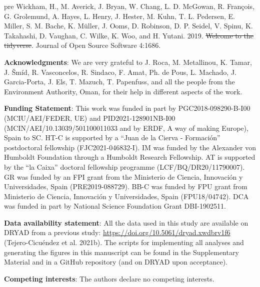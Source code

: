 \documentclass[
  11pt,
]{article}
\newlength{\cslhangindent} %
\newlength{\cslentryspacingunit} %
\newenvironment{CSLReferences}[2] %
 {%
  \setlength{\parindent}{0pt} %
  \ifodd #1 %
  \let\oldpar\par %
  \def\par{\hangindent=\cslhangindent\oldpar} %
  \fi %
  \setlength{\parskip}{#2\cslentryspacingunit} %
 }%
 {} %
\providecommand{\DIFaddtex}[1]{{\protect\color{blue}\uwave{#1}}} %
\providecommand{\DIFdeltex}[1]{{\protect\color{red}\sout{#1}}}                      %
\providecommand{\DIFaddbegin}{} %
\providecommand{\DIFaddend}{} %
\providecommand{\DIFdelbegin}{} %
\providecommand{\DIFdelend}{} %
\providecommand{\DIFadd}[1]{\texorpdfstring{\DIFaddtex{#1}}{#1}} %
\providecommand{\DIFdel}[1]{\texorpdfstring{\DIFdeltex{#1}}{}} %
\newcommand{\DIFscaledelfig}{0.5}
\newlength{\DIFdelgraphicswidth} %
\newlength{\DIFdelgraphicsheight} %
\newcommand{\DIFaddincludegraphics}[2][]{{\color{blue}\fbox{\DIFOincludegraphics[#1]{#2}}}} %
\newcommand{\DIFdelincludegraphics}[2][]{%
\sbox{\DIFdelgraphicsbox}{\DIFOincludegraphics[#1]{#2}}%
\settoboxwidth{\DIFdelgraphicswidth}{\DIFdelgraphicsbox} %
\settoboxtotalheight{\DIFdelgraphicsheight}{\DIFdelgraphicsbox} %
\scalebox{\DIFscaledelfig}{%
\parbox[b]{\DIFdelgraphicswidth}{\usebox{\DIFdelgraphicsbox}\\[-\baselineskip] \rule{\DIFdelgraphicswidth}{0em}}\llap{\resizebox{\DIFdelgraphicswidth}{\DIFdelgraphicsheight}{%
\setlength{\unitlength}{\DIFdelgraphicswidth}%
\begin{picture}(1,1)%
\thicklines\linethickness{2pt} %
{\color[rgb]{1,0,0}\put(0,0){\framebox(1,1){}}}%
{\color[rgb]{1,0,0}\put(0,0){\line( 1,1){1}}}%
{\color[rgb]{1,0,0}\put(0,1){\line(1,-1){1}}}%
\end{picture}%
}\hspace*{3pt}}} %
} %
\DeclareRobustCommand{\DIFaddbegin}{\DIFOaddbegin \let\includegraphics\DIFaddincludegraphics} %
\DeclareRobustCommand{\DIFaddend}{\DIFOaddend \let\includegraphics\DIFOincludegraphics} %
\DeclareRobustCommand{\DIFdelbegin}{\DIFOdelbegin \let\includegraphics\DIFdelincludegraphics} %
\DeclareRobustCommand{\DIFdelend}{\DIFOaddend \let\includegraphics\DIFOincludegraphics} %
\begin{document}
\begin{CSLReferences}{1}{0}
\leavevmode\DIFaddbegin \vadjust \DIFadd{pre}{\DIFaddend \hypertarget{ref-Wickham2019}{}\DIFaddbegin }\DIFaddend %
Wickham, H., M. Averick, J. Bryan, W. Chang, L. D. McGowan, R. François,
G. Grolemund, A. Hayes, L. Henry, J. Hester, M. Kuhn, T. L. Pedersen, E.
Miller, S. M. Bache, K. Müller, J. Ooms, D. Robinson, D. P. Seidel, V.
Spinu, K. Takahashi, D. Vaughan, C. Wilke, K. Woo, and H. Yutani. 2019.
\DIFdelbegin \DIFdel{Welcome to the tidyverse}\DIFdelend \DIFaddbegin \href{https://doi.org/10.21105/joss.01686}{\DIFadd{Welcome to the }{\DIFadd{tidyverse}}}\DIFaddend .
Journal of Open Source Software 4:1686.

\DIFaddbegin \end{CSLReferences}

\DIFaddend \newpage

\hfill\break

\textbf{Acknowledgments}: We are very grateful to J. Roca, M.
Metallinou, K. Tamar, J. Šmíd, R. Vasconcelos, R. Sindaco, F. Amat, Ph.
de Pous, L. Machado, J. Garcia-Porta, J. Els, T. Mazuch, T. Papenfuss,
and all the people from the Environment Authority, Oman, for their help
in different aspects of the work.

\textbf{Funding Statement}: This work was funded in part by
PGC2018-098290-B-I00 (MCIU/AEI/FEDER, UE) and PID2021-128901NB-I00
(MCIN/AEI/10.13039/501100011033 and by ERDF, A way of making Europe),
Spain to SC. HT-C is supported by a ``Juan de la Cierva - Formación''
postdoctoral fellowship (FJC2021-046832-I). IM was funded by the
Alexander von Humboldt Foundation through a Humboldt Research
Fellowship. AT is supported by the ``la Caixa'' doctoral fellowship
programme (LCF/BQ/DR20/11790007). GR was funded by an FPI grant from the
Ministerio de Ciencia, Innovación y Universidades, Spain
(PRE2019-088729). BB-C was funded by FPU grant from Ministerio de
Ciencia, Innovación y Universidades, Spain (FPU18/04742). DCA was funded
in part by National Science Foundation Grant DBI-1902511.

\textbf{Data availability statement}: All the data used in this study
are available on DRYAD from a previous study:
\url{https://doi.org/10.5061/dryad.xwdbrv1f6} (Tejero-Cicuéndez et al.
2021b). The scripts for implementing all analyses and generating the
figures in this manuscript can be found in the Supplementary Material
and in a GitHub repository (and on DRYAD upon acceptance).

\textbf{Competing interests}: The authors declare no competing
interests.
\end{document}
